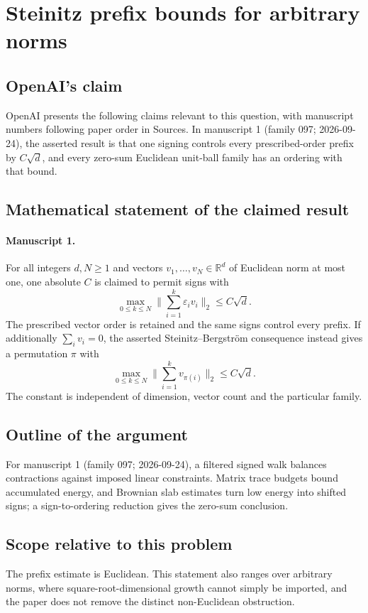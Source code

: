 \documentclass[11pt]{article}
\begin{document}
\section*{Steinitz prefix bounds for arbitrary norms}

\subsection{OpenAI's claim}
OpenAI presents the following claims relevant to this question, with manuscript numbers following paper order in Sources. In manuscript 1 (family 097; 2026-09-24), the asserted result is that one signing controls every prescribed-order prefix by $C\sqrt d$, and every zero-sum Euclidean unit-ball family has an ordering with that bound.

\subsection{Mathematical statement of the claimed result}
\paragraph{Manuscript 1.}
For all integers $d,N\ge1$ and vectors $v_1,\ldots,v_N\in\mathbb R^d$ of Euclidean norm at most one, one absolute $C$ is claimed to permit signs with
\[
 \max_{0\le k\le N}\|\sum_{i=1}^k\varepsilon_iv_i\|_2\le C\sqrt d.
\]
The prescribed vector order is retained and the same signs control every prefix. If additionally $\sum_iv_i=0$, the asserted Steinitz--Bergstr\"om consequence instead gives a permutation $\pi$ with
\[
 \max_{0\le k\le N}\|\sum_{i=1}^kv_{\pi(i)}\|_2\le C\sqrt d.
\]
The constant is independent of dimension, vector count and the particular family.

\subsection{Outline of the argument}
For manuscript 1 (family 097; 2026-09-24), a filtered signed walk balances contractions against imposed linear constraints. Matrix trace budgets bound accumulated energy, and Brownian slab estimates turn low energy into shifted signs; a sign-to-ordering reduction gives the zero-sum conclusion.

\subsection{Scope relative to this problem}
The prefix estimate is Euclidean. This statement also ranges over arbitrary norms, where square-root-dimensional growth cannot simply be imported, and the paper does not remove the distinct non-Euclidean obstruction.
\end{document}
